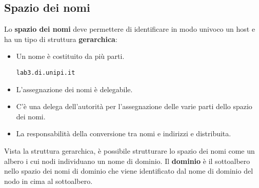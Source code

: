 \subsection{Spazio dei nomi}
Lo \textbf{spazio dei nomi} deve permettere di identificare in modo univoco un host e ha un tipo
di struttura \textbf{gerarchica}:
\begin{itemize}
	\item Un nome è costituito da più parti.
		\begin{center} \verb|lab3.di.unipi.it| \end{center}
	\item L'assegnazione dei nomi è delegabile.
	\item C'è una delega dell'autorità per l'assegnazione delle varie parti dello spazio dei nomi.
	\item La responsabilità della conversione tra nomi e indirizzi e distribuita.
\end{itemize}
Vista la struttura gerarchica, è possibile strutturare lo spazio dei nomi come un albero i cui
nodi individuano un nome di dominio. Il \textbf{dominio} è il sottoalbero nello spazio dei nomi di
dominio che viene identificato dal nome di dominio del nodo in cima al sottoalbero.
